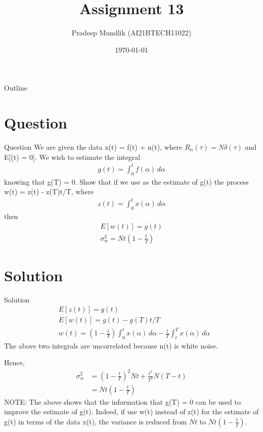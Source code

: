 \documentclass{beamer}
\title{Assignment 13}
\author{Pradeep Mundlik (AI21BTECH11022)}
\date{\today}
\begin{document}
\begin{frame}
    \titlepage 
\end{frame}



\begin{frame}{Outline}
    \tableofcontents
\end{frame}


\section{Question}
\begin{frame}{Question}
        We are given the data x(t) = f(t) + n(t), where $R_n(\tau) = N\delta(\tau)$ and E[(t) = 0]. We wish to estimate the integral 
        \begin{align}
            g(t) = \int_{0}^{t} f(\alpha) \,d\alpha 
        \end{align}
        knowing that g(T) = 0. Show that if we use as the estimate of g(t) the process w(t) = z(t) - z(T)t/T, where 
        \begin{align}
            z(t) = \int_{0}^{t} x(\alpha) \,d\alpha
        \end{align}
        then 
        \begin{align}
            E[w(t)] = g(t) \\
            \sigma_w ^2 = Nt\left(1 - \frac{t}{T}\right)
        \end{align}
\end{frame}

\section{Solution}
\begin{frame}{Solution}
        \begin{align}
            &E[z(t)] = g(t) \\
            &E[w(t)] = g(t) - g(T)t/T  \\
            &w(t) = \left(1 - \frac{t}{T}\right)\int_{0}^{t} x(\alpha) \,d\alpha - \frac{t}{T}\int_{t}^{T} x(\alpha) \,d\alpha
        \end{align}
        The above two integrals are uncorrelated because n(t) is white noise. 
\end{frame}
\begin{frame}
    Hence, 
    \begin{align}
        \sigma_w ^2 &= \left(1 - \frac{t}{T}\right)^2 Nt + \frac{t^2}{T^2} N(T - t) \\
         &= Nt\left(1 - \frac{t}{T}\right)
    \end{align}
    NOTE: The above shows that the information that g(T) = 0 can be used to improve the estimate of g(t). Indeed, if use w(t) instead of z(t) for the estimate of g(t) in terms of the data x(t), the variance is reduced from $Nt$ to $Nt\left(1 - \frac{t}{T}\right)$.
\end{frame}
\end{document}
